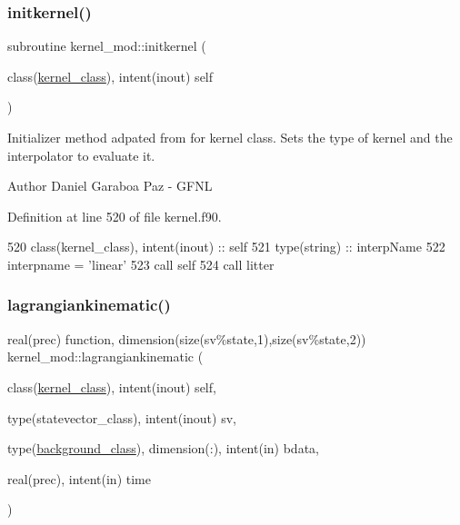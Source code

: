 \subsubsection{\texorpdfstring{initkernel()}{initkernel()}}
{\footnotesize\ttfamily subroutine kernel\+\_\+mod\+::initkernel (\begin{DoxyParamCaption}\item[{class(\mbox{\hyperlink{structkernel__mod_1_1kernel__class}{kernel\+\_\+class}}), intent(inout)}]{self }\end{DoxyParamCaption})}



Initializer method adpated from for kernel class. Sets the type of kernel and the interpolator to evaluate it. 

\begin{DoxyAuthor}{Author}
Daniel Garaboa Paz -\/ G\+F\+NL 
\end{DoxyAuthor}


Definition at line 520 of file kernel.\+f90.


\begin{DoxyCode}
520     \textcolor{keywordtype}{class}(kernel\_class), \textcolor{keywordtype}{intent(inout)} :: self
521     \textcolor{keywordtype}{type}(string) :: interpName
522     interpname = \textcolor{stringliteral}{'linear'}
523     \textcolor{keyword}{call }self%
524     \textcolor{keyword}{call }litter%
\end{DoxyCode}
\mbox{\label{namespacekernel__mod_a7a181eab538ac32b3bddcf4bb34503bd}} 
\subsubsection{\texorpdfstring{lagrangiankinematic()}{lagrangiankinematic()}}
{\footnotesize\ttfamily real(prec) function, dimension(size(sv\%state,1),size(sv\%state,2)) kernel\+\_\+mod\+::lagrangiankinematic (\begin{DoxyParamCaption}\item[{class(\mbox{\hyperlink{structkernel__mod_1_1kernel__class}{kernel\+\_\+class}}), intent(inout)}]{self,  }\item[{type(statevector\+\_\+class), intent(inout)}]{sv,  }\item[{type(\mbox{\hyperlink{structbackground__mod_1_1background__class}{background\+\_\+class}}), dimension(\+:), intent(in)}]{bdata,  }\item[{real(prec), intent(in)}]{time }\end{DoxyParamCaption})}



